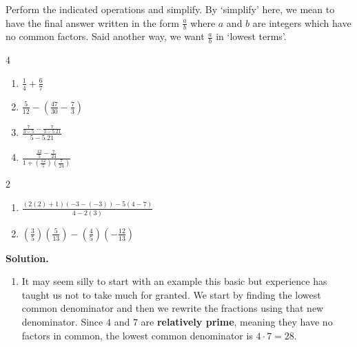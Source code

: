 \documentclass{ximera}
\begin{document}
\begin{example} \label{fractionreview}  Perform the indicated operations and simplify. By `simplify' here, we mean to have the final answer written in the form $\frac{a}{b}$ where $a$ and $b$ are integers which have no common factors.  Said another way, we want $\frac{a}{b}$ in `lowest terms'.

\begin{multicols}{4}
\begin{enumerate}

\item $\frac{1}{4} + \frac{6}{7}$
\item $\frac{5}{12} - \left(\frac{47}{30} - \frac{7}{3}\right)$
\item $\frac{\frac{7}{3-5} - \frac{7}{3-5.21}}{5-5.21}$
\item $\frac{\frac{12}{5} - \frac{7}{24}}{1 + \left(\frac{12}{5}\right) \left(\frac{7}{24}\right)}$ 

\setcounter{HW}{\value{enumi}}
\end{enumerate}
\end{multicols}


\begin{multicols}{2}
\begin{enumerate}
\setcounter{enumi}{\value{HW}}

\item $\frac{(2(2)+1)(-3-(-3)) - 5(4-7)}{4-2(3)}$
\item $\left(\frac{3}{5} \right) \left(\frac{5}{13} \right) - \left(\frac{4}{5}\right) \left( - \frac{12}{13}\right)$

\setcounter{HW}{\value{enumi}}
\end{enumerate}
\end{multicols}

{\bf Solution.}

\begin{enumerate}

\item It may seem silly to start with an example this basic but experience has taught us not to take much for granted.  We start by finding the lowest common denominator and then we rewrite the fractions using that new denominator.  Since $4$ and $7$ are {\bf relatively prime}, meaning they have no factors in common, the lowest common denominator is $4 \cdot 7 = 28$.\[ \begin{array}{rclr}


\end{array}\]
\end{enumerate}
\end{example}
\end{document}
